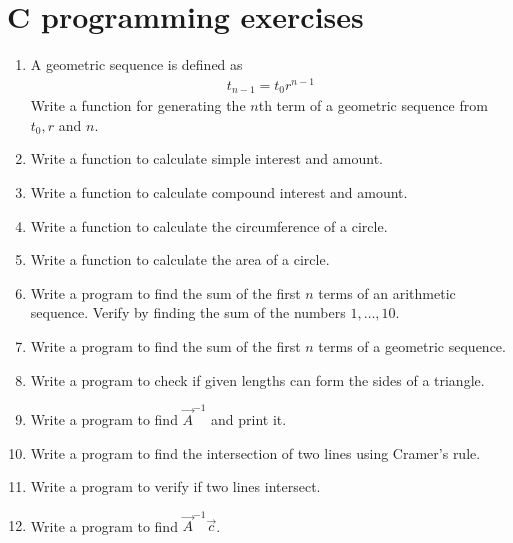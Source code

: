 \documentclass[journal,12pt,twocolumn]{IEEEtran}
\renewcommand\thesection{\arabic{section}}
\begin{document}
\section{C programming exercises}
\begin{enumerate}[label=\thesection.\arabic*
,ref=\thesection.\theenumi]
\item A geometric sequence is defined as
\begin{align}
\label{eq:geo}
t_{n-1} = t_0r^{n-1}
\end{align}
Write a function for generating the $n$th term of a geometric sequence from $t_0, r$ and $n$.
\\
\solution 

%
\item Write a function to calculate simple interest and amount.
\item Write a function to calculate compound interest and amount.
\item Write a function to calculate the circumference of a circle.
\\
\solution 

\item Write a function to calculate the area of a circle.

\item Write a program to find the sum of the first  $n$ terms of an arithmetic sequence. Verify by finding the 
sum of the numbers $1,\dots, 10$.
\\
\solution 

\item Write a program to find the sum of the first  $n$ terms of a geometric sequence.
\item Write a program to check if given lengths  can form the sides of a triangle.
\\
\solution 


%
\item Write a program to find $\vec{A}^{-1}$ and print it.
\\
\solution 

\item Write a program to find the intersection of two lines using Cramer's rule.
\item Write a program to verify if two lines intersect.
\item Write a program to find $\vec{A}^{-1}\vec{c}$.
%

\end{enumerate}
\end{document}
